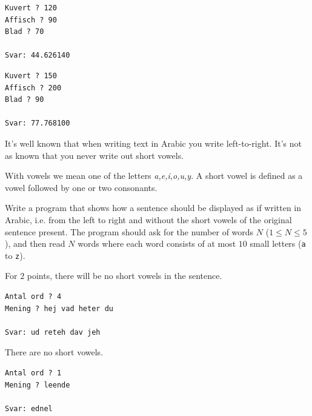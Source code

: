 
\vspace{1cm}

\begin{verbatim}
Kuvert ? 120
Affisch ? 90
Blad ? 70

Svar: 44.626140
\end{verbatim}

\vspace{1cm}

\begin{verbatim}
Kuvert ? 150
Affisch ? 200
Blad ? 90

Svar: 77.768100
\end{verbatim}



\newpage
{}
It's well known that when writing text in Arabic you write left-to-right.
It's not as known that you never write out short vowels.

With vowels we mean one of the letters \textit{a,e,i,o,u,y}.
A short vowel is defined as a vowel followed by one or two consonants.

Write a program that shows how a sentence should be displayed as if written in Arabic, i.e. from the left to right and without the short vowels of the original sentence present.
The program should ask for the number of words $N$ ($1 \le N \le 5$), and then read $N$ words where each word consists of at most $10$ small letters (\texttt{a} to \texttt{z}).


 For $2$ points, there will be no short vowels in the sentence.

\vspace{1cm}



\begin{verbatim}
Antal ord ? 4
Mening ? hej vad heter du

Svar: ud reteh dav jeh
\end{verbatim}

 There are no short vowels.

\vspace{1cm}

\begin{verbatim}
Antal ord ? 1
Mening ? leende

Svar: ednel
\end{verbatim}

